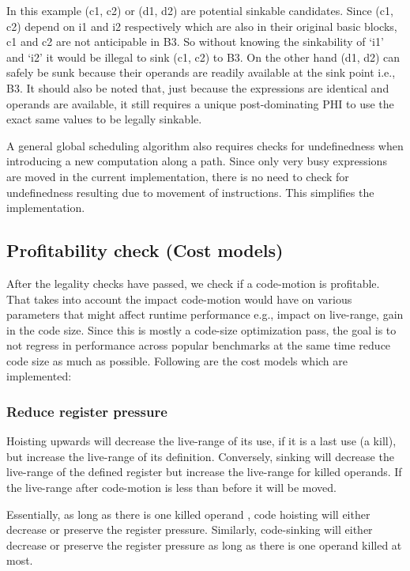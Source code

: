 \documentclass[acmlarge,review]{acmart}\settopmatter{printfolios=true}
\begin{document}
In this example (c1, c2) or (d1, d2) are potential sinkable candidates. Since
(c1, c2) depend on i1 and i2 respectively which are also in their original basic
blocks, c1 and c2 are not anticipable in B3. So without knowing the sinkability
of `i1' and `i2' it would be illegal to sink (c1, c2) to B3. On the other hand
(d1, d2) can safely be sunk because their operands are readily available at the
sink point i.e., B3. It should also be noted that, just because the expressions
are identical and operands are available, it still requires a unique
post-dominating PHI to use the exact same values to be legally sinkable.

A general global scheduling algorithm also requires checks for undefinedness
when introducing a new computation along a path. Since only very busy
expressions are moved in the current implementation, there is no need to check
for undefinedness resulting due to movement of instructions. This simplifies the
implementation.

\subsection{Profitability check (Cost models)}
\label{sec:cost-models}
After the legality checks have passed, we check if a code-motion is profitable.
That takes into account the impact code-motion would have on various parameters
that might affect runtime performance e.g., impact on live-range, gain in the
code size. Since this is mostly a code-size optimization pass, the goal is to
not regress in performance across popular benchmarks at the same time reduce
code size as much as possible. Following are the cost models which are
implemented:

\subsubsection{Reduce register pressure}
\label{hoist:reg-pressure}
Hoisting upwards will decrease the live-range of its use, if it is a last use (a
kill), but increase the live-range of its definition. Conversely, sinking will
decrease the live-range of the defined register but increase the live-range for
killed operands. If the live-range after code-motion is less than before it will
be moved.

Essentially, as long as there is one killed operand , code hoisting will either
decrease or preserve the register pressure. Similarly, code-sinking will either
decrease or preserve the register pressure as long as there is one operand
killed at most.
\end{document}

